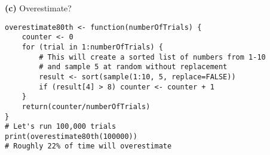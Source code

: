 \documentclass[11pt]{article}
\renewcommand\part[1]{\vspace{.10in}\textbf{(#1)}}
\begin{document}
\part{c} {Overestimate?}
\begin{lstlisting}
overestimate80th <- function(numberOfTrials) {
    counter <- 0
    for (trial in 1:numberOfTrials) {
        # This will create a sorted list of numbers from 1-10
        # and sample 5 at random without replacement
        result <- sort(sample(1:10, 5, replace=FALSE))
        if (result[4] > 8) counter <- counter + 1
    }
    return(counter/numberOfTrials)
}
# Let's run 100,000 trials
print(overestimate80th(100000))
# Roughly 22% of time will overestimate
\end{lstlisting}
\end{document}
